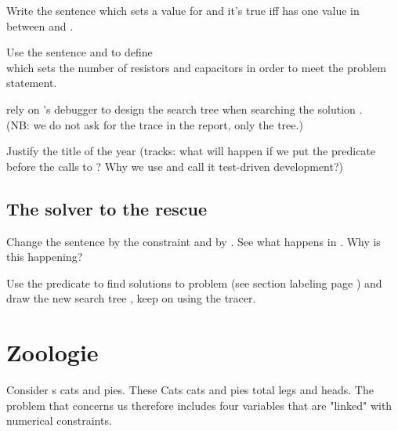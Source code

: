 \begin{question}
 Write the sentence  which sets a value for   and it's true iff  has one value in between  and .
\end{question}
\begin{question} 
Use the sentence  and \code{>=} to define \\ which sets the number of resistors and capacitors in order to meet the problem statement.
\end{question}
\begin{question}\label{QCA1}
  rely on \eclipse{}'s debugger to design the \prolog{} search tree when searching the solution .  \\
 (NB: we do not ask for the trace in the report,
   only the tree.)
\end{question}
\begin{question}\label{QC3}
Justify the title of the year (tracks: what will happen if we put the predicate~\code{>=} before the calls to  ? Why we use and call it test-driven development?)
\end{question}

\subsection{The solver  to the rescue}
\begin{question}\label{QC4}
 Change the sentence  by the constraint   and \code{>=} by \code{\#>=}. See what happens in \eclipse{}. Why is this happening? 
\end{question}

\begin{question}\label{QCA2}
Use the  predicate to find solutions to
   problem (see section labeling page \pageref{intro:labeling})  and
   draw the new search tree \prolog{}, keep on using the tracer.
\end{question}



\section{Zoologie}
\label{sec:zoologie}

Consider s cats and  pies. These  Cats cats and  pies total 
legs and  heads. The problem that concerns us therefore includes four
variables that are "linked" with numerical constraints.


